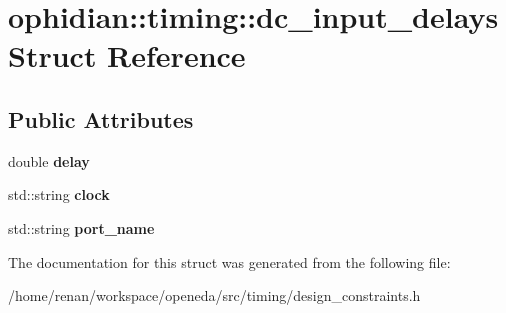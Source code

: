 \hypertarget{structophidian_1_1timing_1_1dc__input__delays}{\section{ophidian\-:\-:timing\-:\-:dc\-\_\-input\-\_\-delays Struct Reference}
\label{structophidian_1_1timing_1_1dc__input__delays}
}
\subsection*{Public Attributes}
\begin{DoxyCompactItemize}
\item 
\hypertarget{structophidian_1_1timing_1_1dc__input__delays_a495c673ee0ea14553af6119d4b0550b1}{double {\bfseries delay}}\label{structophidian_1_1timing_1_1dc__input__delays_a495c673ee0ea14553af6119d4b0550b1}

\item 
\hypertarget{structophidian_1_1timing_1_1dc__input__delays_a61e28999e032f27ba10fde0b7da9413b}{std\-::string {\bfseries clock}}\label{structophidian_1_1timing_1_1dc__input__delays_a61e28999e032f27ba10fde0b7da9413b}

\item 
\hypertarget{structophidian_1_1timing_1_1dc__input__delays_a8739ae9ee3c094a99bc51c04012d891d}{std\-::string {\bfseries port\-\_\-name}}\label{structophidian_1_1timing_1_1dc__input__delays_a8739ae9ee3c094a99bc51c04012d891d}

\end{DoxyCompactItemize}


The documentation for this struct was generated from the following file\-:\begin{DoxyCompactItemize}
\item 
/home/renan/workspace/openeda/src/timing/design\-\_\-constraints.\-h\end{DoxyCompactItemize}
